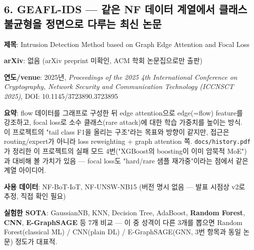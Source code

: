 \subsection{6. GEAFL-IDS — 같은 NF 데이터 계열에서 클래스 불균형을 정면으로 다루는 최신 논문}
\par\noindent \textbullet\enspace \textbf{제목}: Intrusion Detection Method based on Graph Edge Attention and Focal Loss


\par\noindent \textbullet\enspace \textbf{arXiv}: 없음 (arXiv preprint 미확인, ACM 학회 논문집으로만 출판)


\par\noindent \textbullet\enspace \textbf{연도/\allowbreak{}venue}: 2025년, \emph{Proceedings of the 2025 4th International Conference on Cryptography, Network Security and Communication Technology (ICCNSCT 2025)}, DOI: 10.1145/\allowbreak{}3723890.3723895


\par\noindent \textbullet\enspace \textbf{요약}: flow 데이터를 그래프로 구성한 뒤 edge attention으로 edge(=\allowbreak{}flow) feature를 강조하고, focal loss로 소수 클래스(rare attack)에 대한 학습 가중치를 높이는 방식. 이 프로젝트의 "tail class F1을 올리는 구조"라는 목표와 방향이 같지만, 접근은 routing/\allowbreak{}expert가 아니라 loss reweighting +\allowbreak{} graph attention 쪽. \texttt{docs/\allowbreak{}\allowbreak{}his\allowbreak{}tory.\allowbreak{}pdf\allowbreak{}}가 정리한 이 프로젝트의 실패 모드 4번("XGBoost의 boosting이 이미 암묵적 MoE")과 대비해 볼 가치가 있음 — focal loss도 "hard/\allowbreak{}rare 샘플 재가중"이라는 점에서 같은 계열 아이디어.


\par\noindent \textbullet\enspace \textbf{사용 데이터}: NF-BoT-IoT, NF-UNSW-NB15 (버전 명시 없음 — 발표 시점상 v2로 추정, 직접 확인 필요)


\par\noindent \textbullet\enspace \textbf{실험한 SOTA}: GaussianNB, KNN, Decision Tree, AdaBoost, \textbf{Random Forest}, \textbf{CNN}, \textbf{E-GraphSAGE} 등 7개 비교 — 이 중 성격이 다른 3개를 뽑으면 Random Forest(classical ML) /\allowbreak{} CNN(plain DL) /\allowbreak{} E-GraphSAGE(GNN, 3번 항목과 동일 논문) 정도가 대표적.


